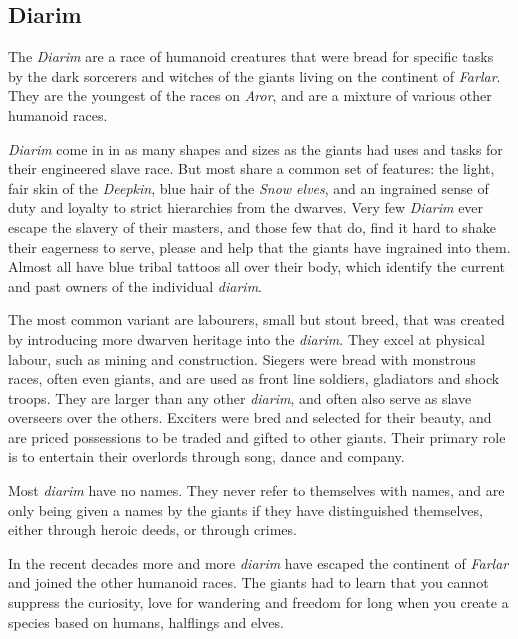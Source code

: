 \subsection{Diarim}
\label{sec:Diarim}


The \emph{Diarim} are a race of humanoid creatures that were bread for
specific tasks by the dark sorcerers and witches of the giants living on the
continent of \emph{Farlar}. They are the youngest of the races on \emph{Aror},
and are a mixture of various other humanoid races.

\emph{Diarim} come in in as many shapes and sizes as the giants had uses and
tasks for their engineered slave race. But most share a common set of features:
the light, fair skin of the \emph{Deepkin}, blue hair of the \emph{Snow elves},
and an ingrained sense of duty and loyalty to strict hierarchies from the
dwarves. Very few \emph{Diarim} ever escape the slavery of their masters, and
those few that do, find it hard to shake their eagerness to serve, please and
help that the giants have ingrained into them. Almost all have blue tribal
tattoos all over their body, which identify the current and past owners of the
individual \emph{diarim}.

The most common variant are labourers, small but stout breed, that was created
by introducing more dwarven heritage into the \emph{diarim}. They excel at
physical labour, such as mining and construction. Siegers were bread with
monstrous races, often even giants, and are used as front line soldiers,
gladiators and shock troops. They are larger than any other \emph{diarim}, and
often also serve as slave overseers over the others. Exciters were bred and
selected for their beauty, and are priced possessions to be traded and gifted
to other giants. Their primary role is to entertain their overlords through
song, dance and company.

Most \emph{diarim} have no names. They never refer to themselves with names,
and are only being given a names by the giants if they have distinguished
themselves, either through heroic deeds, or through crimes.

In the recent decades more and more \emph{diarim} have escaped the continent
of \emph{Farlar} and joined the other humanoid races. The giants had to learn
that you cannot suppress the curiosity, love for wandering and freedom for long
when you create a species based on humans, halflings and elves.

